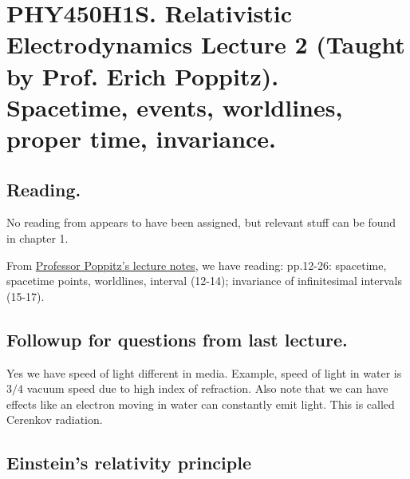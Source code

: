 
%

\chapter{PHY450H1S.  Relativistic Electrodynamics Lecture 2 (Taught by Prof. Erich Poppitz).  Spacetime, events, worldlines, proper time, invariance.}
\label{chap:relativisticElectrodynamicsL2}
{}
\date{Jan 12, 2011}

\beginArtNoToc

\section{Reading.}

No reading from \cite{landau1980classical} appears to have been assigned, but relevant stuff can be found in chapter 1.

From \href{http://www.physics.utoronto.ca/~poppitz/e-poppitz/PHY450_files/RelEM12-26.pdf}{Professor Poppitz's lecture notes}, we have reading: pp.12-26: spacetime, spacetime points, worldlines, interval (12-14); invariance of infinitesimal intervals (15-17).

\section{Followup for questions from last lecture.}

Yes we have speed of light different in media.  Example, speed of light in water is $3/4$ vacuum speed due to high index of refraction.  Also note that we can have effects like an electron moving in water can constantly emit light.  This is called Cerenkov radiation.

\section{Einstein's relativity principle}

